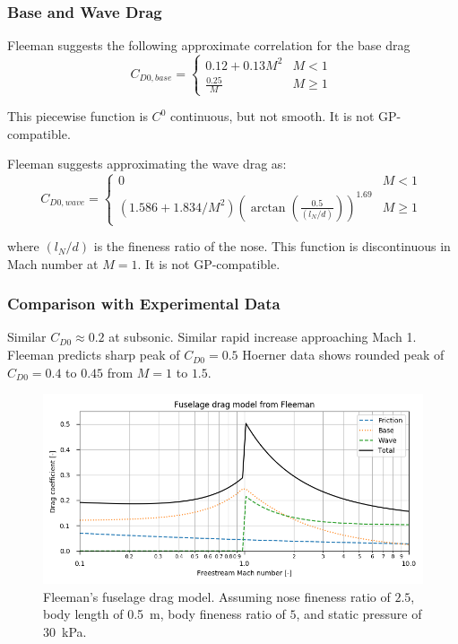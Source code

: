\documentclass[12pt]{article}
\begin{document}
\subsubsection{Base and Wave Drag}
Fleeman suggests the following approximate correlation for the base drag
\begin{equation}
C_{D0, base} = 
  \begin{cases}
    0.12 + 0.13 M^2 & M < 1 \\
    \frac{0.25}{M} & M \geq 1 \
  \end{cases}
\end{equation}

This piecewise function is $C^0$ continuous, but not smooth. It is not GP-compatible.

Fleeman suggests approximating the wave drag as:
\begin{equation}
C_{D0, wave} = 
  \begin{cases}
    0 & M < 1 \\
    (1.586 + 1.834/M^2) \left( \arctan(\frac{0.5}{(l_N/d)})\right)^{1.69} & M \geq 1 \
  \end{cases}
\end{equation}

where $(l_N/d)$ is the fineness ratio of the nose. This function is discontinuous in Mach number at $M = 1$. It is not GP-compatible.

\subsubsection{Comparison with Experimental Data}

Similar $C_{D0} \approx 0.2$ at subsonic.
Similar rapid increase approaching Mach 1.
Fleeman predicts sharp peak of $C_{D0} = 0.5$
Hoerner data shows rounded peak of $C_{D0} = 0.4$ to $0.45$ from $M = 1$ to $1.5$.

\begin{figure}[hbt!]
    \centering
    \includegraphics[width=1\textwidth]{figures/fleeman_fuselage_drag_model}
    \caption{\label{fig:fleeman_fuselage_drag_model} Fleeman's fuselage drag model. Assuming nose fineness ratio of $2.5$, body length of \SI{0.5}{\meter}, body fineness ratio of $5$, and static pressure of \SI{30}{\kilo\pascal}.}
\end{figure}
\end{document}
